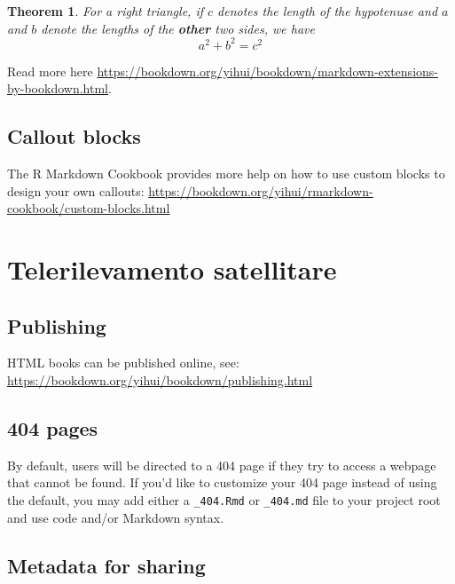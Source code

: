 \documentclass[
]{book}
\newtheorem{theorem}{Theorem}[chapter]
\theoremstyle{definition}
\theoremstyle{definition}
\theoremstyle{definition}
\theoremstyle{definition}
\theoremstyle{remark}
\begin{document}
\begin{theorem}
\protect\hypertarget{thm:tri}{}\label{thm:tri}For a right triangle, if \(c\) denotes the \emph{length} of the hypotenuse
and \(a\) and \(b\) denote the lengths of the \textbf{other} two sides, we have
\[a^2 + b^2 = c^2\]
\end{theorem}

Read more here \url{https://bookdown.org/yihui/bookdown/markdown-extensions-by-bookdown.html}.

\hypertarget{callout-blocks}{%
\section{Callout blocks}\label{callout-blocks}}

The R Markdown Cookbook provides more help on how to use custom blocks to design your own callouts: \url{https://bookdown.org/yihui/rmarkdown-cookbook/custom-blocks.html}

\hypertarget{telerilevamento-satellitare}{%
\chapter{Telerilevamento satellitare}\label{telerilevamento-satellitare}}

\hypertarget{publishing}{%
\section{Publishing}\label{publishing}}

HTML books can be published online, see: \url{https://bookdown.org/yihui/bookdown/publishing.html}

\hypertarget{pages}{%
\section{404 pages}\label{pages}}

By default, users will be directed to a 404 page if they try to access a webpage that cannot be found. If you'd like to customize your 404 page instead of using the default, you may add either a \texttt{\_404.Rmd} or \texttt{\_404.md} file to your project root and use code and/or Markdown syntax.

\hypertarget{metadata-for-sharing}{%
\section{Metadata for sharing}\label{metadata-for-sharing}}
\end{document}
